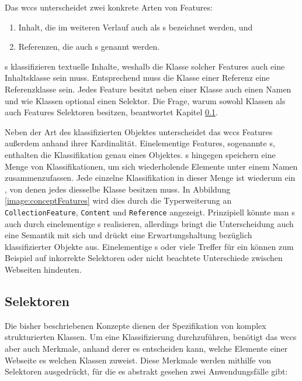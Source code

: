         Das \gls{wccs} unterscheidet zwei konkrete Arten von Features:
        
        \begin{enumerate}
            \item Inhalt, die im weiteren Verlauf auch als {\contentFeature}s bezeichnet werden, und
            \item Referenzen, die auch {}s genannt werden.
        \end{enumerate}

        {\contentFeature}s klassifizieren textuelle Inhalte,
        weshalb die Klasse solcher Features auch eine Inhaltsklasse sein muss.
        Entsprechend muss die Klasse einer Referenz eine Referenzklasse sein.
        Jedes Feature besitzt neben einer Klasse auch einen Namen und wie Klassen optional einen Selektor.
        Die Frage, warum sowohl Klassen als auch Features Selektoren besitzen,
        beantwortet Kapitel \ref{section:conteptSelectors}.

        Neben der Art des klassifizierten Objektes unterscheidet das \gls{wccs} Features
        außerdem anhand ihrer Kardinalität.
        Einelementige Features, sogenannte {\scalarFeature}s, enthalten die Klassifikation genau eines Objektes.
        {\collectionFeature}s hingegen speichern eine Menge von Klassifikationen,
        um sich wiederholende Elemente unter einem Namen zusammenzufassen.
        Jede einzelne Klassifikation in dieser Menge ist wiederum ein {\scalarFeature},
        von denen jedes diesselbe Klasse besitzen muss.
        In Abbildung \ref{image:conceptFeatures} wird dies durch die Typerweiterung an
        \texttt{CollectionFeature}, \texttt{Content} und \texttt{Reference} angezeigt.
        Prinzipiell könnte man {\scalarFeature}s auch durch einelementige {\collectionFeature}s realisieren,
        allerdings bringt die Unterscheidung auch eine Semantik mit sich und drückt eine
        Erwartungshaltung bezüglich klassifizierter Objekte aus.       
        Einelementige {\collectionFeature}s oder viele Treffer für ein {\scalarFeature}
        können zum Beispiel auf inkorrekte Selektoren oder nicht beachtete Unterschiede zwischen Webseiten hindeuten.

    \subsection{Selektoren}
        \label{section:conteptSelectors}
        Die bisher beschriebenen Konzepte dienen der Spezifikation von komplex strukturierten Klassen.
        Um eine Klassifizierung durchzuführen, benötigt das \gls{wccs} aber auch Merkmale,
        anhand derer es entscheiden kann,
        welche Elemente einer Webseite es welchen Klassen zuweist.
        Diese Merkmale werden mithilfe von Selektoren ausgedrückt,
        für die es abstrakt gesehen zwei Anwendungsfälle gibt:

